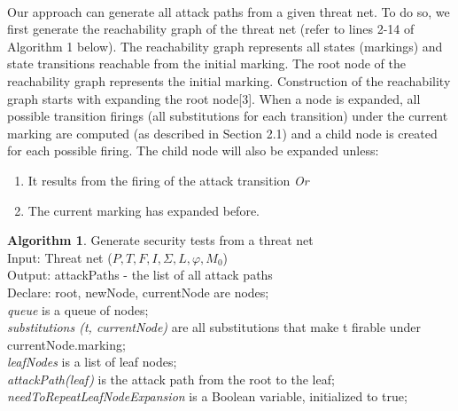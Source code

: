\paragraph{}
Our approach can generate all attack paths from a given threat net. To do so, we first generate the reachability graph of the threat net (refer to lines 2-14 of Algorithm 1 below). The reachability graph represents all states (markings) and
state transitions reachable from the initial marking. The root
node of the reachability graph represents the initial marking.
Construction of the reachability graph starts with expanding
the root node[3]. When a node is expanded, all possible transition firings (all substitutions for each transition) under the current marking are computed (as described in Section 2.1) and a child node is created for each possible firing.
The child node will also be expanded unless:
\begin{enumerate}
\item It results from the firing of the attack transition \textit{Or} 
\item The current marking has expanded before.
\end{enumerate}
\newpage
\textbf{Algorithm 1}. Generate security tests from a threat net
\\Input: Threat net ($P,T,F,I,\Sigma,L,\varphi,M_0$)
\\Output: attackPaths - the list of all attack paths
\\Declare: root, newNode, currentNode are nodes;
\\ \textit{queue} is a queue of nodes;
\\ \textit{substitutions (t, currentNode)} are all substitutions that make t firable under currentNode.marking;
\\ \textit{leafNodes} is a list of leaf nodes;
\\ \textit{attackPath(leaf)} is the attack path from the root to the leaf;
\\ \textit{needToRepeatLeafNodeExpansion} is a Boolean variable,
initialized to true;

